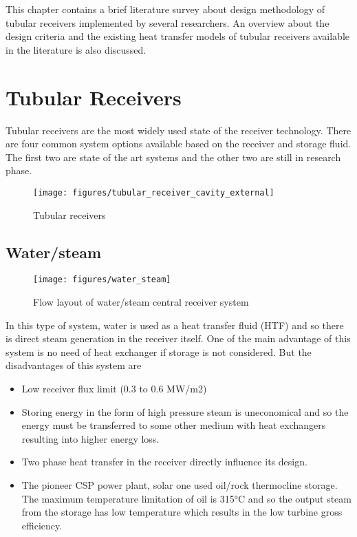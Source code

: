 This chapter contains a brief literature survey about design methodology of tubular receivers implemented by several researchers. An overview about the design criteria and the existing heat transfer models of tubular receivers available in the literature is also discussed.

\section{Tubular Receivers}
Tubular receivers are the most widely used state of the receiver technology. There are four common system options available based on the receiver and storage fluid. The first two are state of the art systems and the other two are still in research phase.
\begin{figure}[h!]
	\texttt{[image: figures/tubular\_receiver\_cavity\_external]}
	\centering
	\caption{Tubular receivers}
\end{figure}
\subsection{Water/steam} 
\begin{figure}[h!]
	\texttt{[image: figures/water\_steam]}
	\centering
	\caption{Flow layout of water/steam central receiver system}
\end{figure}
In this type of system, water is used as a heat transfer fluid (HTF) and so there is direct steam generation in the receiver itself. One of the main advantage of this system is no need of heat exchanger if storage is not considered. But the disadvantages of this system are
\begin{itemize}
\item Low receiver flux limit (0.3 to 0.6 MW/m2)
\item  Storing energy in the form of high pressure steam is uneconomical and so the energy must be transferred to some other medium with heat exchangers resulting into higher energy loss.
\item  Two phase heat transfer in the receiver directly influence its design.
\item  The pioneer CSP power plant, solar one used oil/rock thermocline storage. The maximum temperature limitation of oil is 315°C and so the output steam from the storage has low temperature which results in the low turbine gross efficiency.
\end{itemize}
